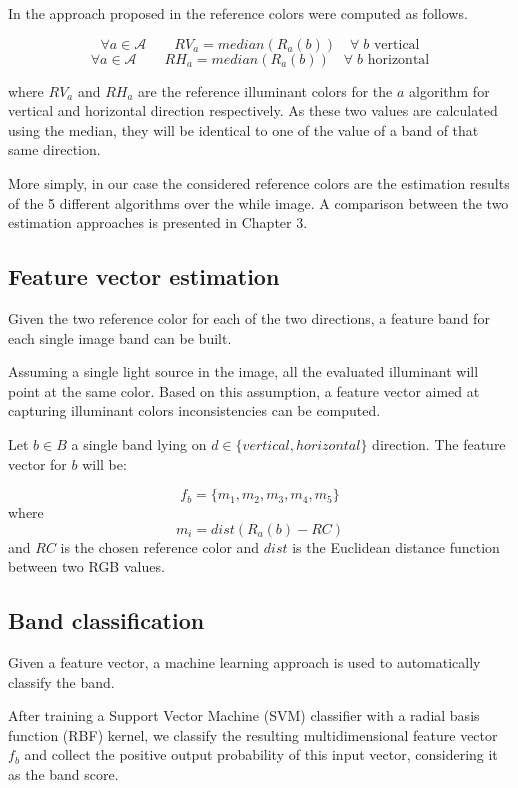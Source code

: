 In the approach proposed in \cite{fan2015image} the reference colors were computed as follows.
 
$$
\forall a \in \mathcal{A} \qquad RV_a = median(R_a(b)) \quad \forall \; b \textrm{ vertical}
$$
$$
\forall a \in \mathcal{A} \qquad RH_a = median(R_a(b)) \quad \forall \; b \textrm{ horizontal}
$$

where $RV_a$ and $RH_a$ are the reference illuminant colors for the $a$ algorithm for vertical and horizontal direction respectively. As these two values are calculated using the median, they will be identical to one of the value of a band of that same direction.

More simply, in our case the considered reference colors are the estimation results of the 5 different algorithms over the while image. A comparison between the two estimation approaches is presented in Chapter 3.

\subsection{Feature vector estimation}

Given the two reference color for each of the two directions, a feature band for each single image band can be built.

Assuming a single light source in the image, all the evaluated illuminant will point at the same color.
Based on this assumption, a feature vector aimed at capturing illuminant colors inconsistencies can be computed.

Let $b \in B$ a single band lying on $d \in \{vertical, horizontal\}$ direction. The feature vector for $b$ will be:

\begin{equation}\label{eq:regionsfeaturevector}
f_{b} = \{m_1, m_2, m_3, m_4, m_5\}
\end{equation}
where
$$
m_i = dist(R_a(b) - RC)
$$
and $RC$ is the chosen reference color and $dist$ is the Euclidean distance function between two RGB values.

\subsection{Band classification}

Given a feature vector, a machine learning approach is used to automatically classify the band. 

After training a Support Vector Machine (SVM)\cite{bishop2007pattern} classifier with a radial basis function (RBF) kernel, we classify the resulting multidimensional feature vector $f_b$ and collect the positive output probability of this input vector, considering it as the band score.

